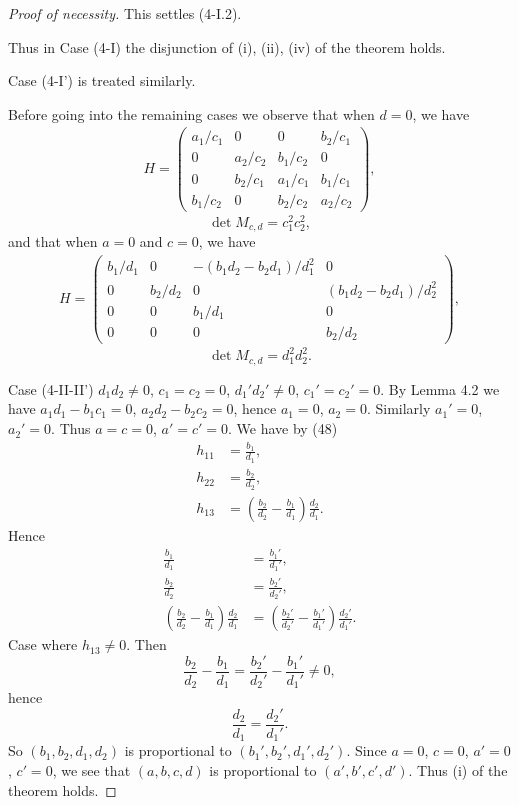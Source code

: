 \documentclass{article}
\begin{document}
\begin{proof}[Proof of necessity]
This settles (4-I.2).

Thus in Case (4-I) the disjunction of (i), (ii), (iv) of the theorem holds.

Case (4-I') is treated similarly.

Before going into the remaining cases we observe that 
when  $d=0$, we have
\begin{align*}
H=\begin{pmatrix}
a_1/c_1 & 0 & 0 & b_2/c_1\\ 
0 & a_2/c_2 & b_1/c_2 & 0\\
0 & b_2/c_1 & a_1/c_1 & b_1/c_1\\ 
b_1/c_2 & 0 & b_2/c_2 & a_2/c_2
\end{pmatrix},
\tag{47}
\end{align*}
$$
\det M_{c,d}=c_1^2c_2^2,
$$
and that when $a=0$ and  $c=0$, we have
\begin{align*}  
H=\begin{pmatrix}
b_1/d_1 & 0 & -(b_1 d_2 -b_2 d_1)/d_1^2 & 0\\
0 & b_2/d_2 & 0 & (b_1 d_2 -b_2 d_1)/d_2^2\\
0 & 0 & b_1/d_1 & 0\\ 
0 & 0 & 0 & b_2/d_2
\end{pmatrix},
\tag{48}
\end{align*}  
$$
\det M_{c,d}=d_1^2d_2^2.
$$


Case (4-II-II') $d_1d_2\ne 0$, $c_1=c_2=0$,
$d_1'd_2'\ne 0$, $c_1'=c_2'=0$.
By Lemma 4.2
we have
$a_1d_1-b_1c_1=0$, $a_2d_2-b_2c_2=0$, 
hence
$a_1=0$, $a_2=0$.
Similarly
$a_1'=0$, $a_2'=0$.
Thus $a=c=0$, $a'=c'=0$.
We have by (48)
\begin{align*}
h_{11}&=\frac{b_1}{d_1},\\
h_{22}&=\frac{b_2}{d_2},\\
h_{13}&=(\frac{b_2}{d_2}-\frac{b_1}{d_1})\frac{d_2}{d_1}.
\end{align*}
Hence
\begin{align*}
\frac{b_1}{d_1}&=\frac{b_1'}{d_1'},\\
\frac{b_2}{d_2}&=\frac{b_2'}{d_2'},\\
(\frac{b_2}{d_2}-\frac{b_1}{d_1})\frac{d_2}{d_1}&=
(\frac{b_2'}{d_2'}-\frac{b_1'}{d_1'})\frac{d_2'}{d_1'}.
\end{align*}
Case where $h_{13}\ne 0$.
Then
$$
\frac{b_2}{d_2}-\frac{b_1}{d_1}=\frac{b_2'}{d_2'}-\frac{b_1'}{d_1'}\ne 0,
$$
hence
$$
\frac{d_2}{d_1}=\frac{d_2'}{d_1'}.
$$
So
$(b_1,b_2,d_1,d_2)$ is proportional to $(b_1',b_2',d_1',d_2')$.
Since $a=0$, $c=0$, $a'=0$, $c'=0$, we see that
$(a,b,c,d)$ is proportional to $(a',b',c',d')$.
Thus (i) of the theorem holds.


\end{proof}
\end{document}
